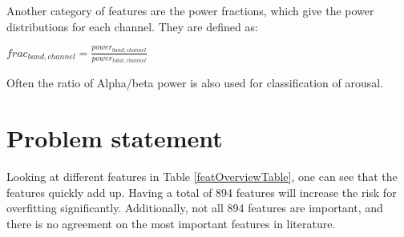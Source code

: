 \documentclass[11pt,journal,compsoc]{IEEEtran}
\newcommand{\npar}{\par \vspace{2.3ex plus 0.3ex minus 0.3ex}}
\begin{document}
\npar

Another category of features are the power fractions, which give the power distributions for each channel\citep{ExtendedPaper}. They are defined as:
\begin{center}
$frac_{band,channel} = \frac{power_{band,channel}}{power_{total,channel}}$
\end{center}
Often the ratio of Alpha/beta power is also used for classification of arousal\citep{ref4}.

\section{Problem statement}\label{problem}
Looking at different features in Table \ref{featOverviewTable}, one can see that the features quickly add up. Having a total of 894 features will increase the risk for overfitting significantly\citep{rfPaper}. Additionally, not all 894 features are important, and there is no agreement on the most important features in literature. 
\end{document}
